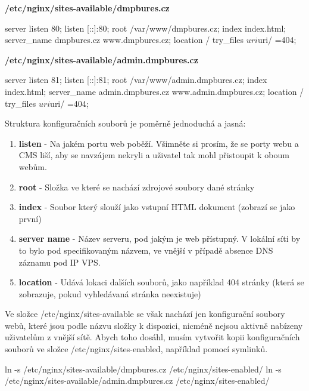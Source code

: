 \documentclass[12pt,a4paper]{report}
\begin{document}
  \noindent\textbf{/etc/nginx/sites-available/dmpbures.cz}
  \begin{bash}
  server {
    listen 80;
    listen [::]:80;
    root /var/www/dmpbures.cz;
    index index.html;
    server_name dmpbures.cz www.dmpbures.cz;
    location / {
      try_files $uri $uri/ =404;
    }
  }
  \end{bash}

  \noindent\textbf{/etc/nginx/sites-available/admin.dmpbures.cz}
  \begin{bash}
  server {
    listen 81;
    listen [::]:81;
    root /var/www/admin.dmpbures.cz;
    index index.html;
    server_name admin.dmpbures.cz www.admin.dmpbures.cz;
    location / {
      try_files $uri $uri/ =404;
    }
  }
  \end{bash}
  
  Struktura konfiguračních souborů je poměrně jednoduchá a jasná: 
  \begin{enumerate}
    \item \textbf{listen} - Na jakém portu web poběží. Všimněte si prosím, že se porty webu a CMS liší, aby se navzájem nekryli a uživatel tak mohl přistoupit k oboum webům.
    \item \textbf{root} - Složka ve které se nachází zdrojové soubory dané stránky
    \item \textbf{index} - Soubor který slouží jako vstupní HTML dokument (zobrazí se jako první)
    \item \textbf{server name} - Název serveru, pod jakým je web přístupný. V lokální síti by to bylo pod specifikovaným názvem, ve vnější v případě absence DNS záznamu pod IP VPS.
    \item \textbf{location} - Udává lokaci dalších souborů, jako například 404 stránky (která se zobrazuje, pokud vyhledávaná stránka neexistuje)
  \end{enumerate}

  Ve složce /etc/nginx/sites-available se však nachází jen konfigurační soubory webů,
  které jsou podle názvu složky k dispozici, nicméně nejsou aktivně nabízeny uživatelům z vnější sítě. 
  Abych toho dosáhl, musím vytvořit kopii konfiguračních souborů ve složce /etc/nginx/sites-enabled, například pomocí symlinků.

  \begin{bash}
    ln -s /etc/nginx/sites-available/dmpbures.cz 
    /etc/nginx/sites-enabled/
    ln -s /etc/nginx/sites-available/admin.dmpbures.cz
     /etc/nginx/sites-enabled/
  \end{bash}
\end{document}
